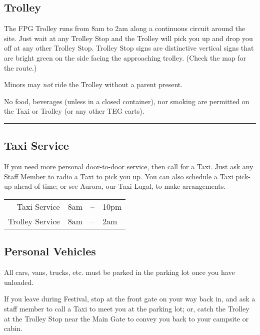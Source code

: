 \documentclass[9pt,twoside,openright,final,article,letterpaper]{memoir}
\renewcommand{\pfbreakdisplay}{%
  \needspace{24pt}%
  \vspace{8pt}\\\ding{76}\quad\ding{77}\quad\ding{78}\\%
  \vspace{11pt}}
\let\oldsubsection=\subsection
\renewcommand{\subsection}[1]{%
  \vspace{6pt}
  \needspace{1.25in}
  \oldsubsection{#1}
  \nopagebreak}
\begin{document}
\begin{multicols}{2}

  \subsection{Trolley}

  The FPG Trolley runs from 8am to 2am along a continuous circuit
  around the site. Just wait at any Trolley Stop and the Trolley will
  pick you up and drop you off at any other Trolley Stop. Trolley Stop
  signs are distinctive vertical signs that are bright green on the
  side facing the approaching trolley. (Check the map for the route.)

  Minors may \emph{not} ride the Trolley without a parent present.

  No food, beverages ({\small unless in a closed container}), nor
  smoking are permitted on the Taxi or Trolley (or any other TEG
  carts).

  \fancybreak{\pfbreakdisplay}

  \subsection{Taxi Service}

  If you need more personal door-to-door service, then call for a
  Taxi. Just ask any Staff Member to radio a Taxi to pick you up. You
  can also schedule a Taxi pick-up ahead of time; or see Aurora, our
  Taxi Lugal, to make arrangements.


\begin{center}
  \begin{tabular}{rrcl}
    \hline \large
    Taxi Service & \indent 8am & -- & 10pm \\
    Trolley Service & \indent 8am & -- & 2am \\
    \hline
  \end{tabular}
\end{center}


  \columnbreak

  \subsection{Personal Vehicles}

  All cars, vans, trucks, etc. must be parked in the parking lot once
  you have unloaded.

  If you leave during Festival, stop at the front gate on your way
  back in, and ask a staff member to call a Taxi to meet you at the
  parking lot; or, catch the Trolley at the Trolley Stop near the Main
  Gate to convey you back to your campsite or cabin.


\end{multicols}
\end{document}
